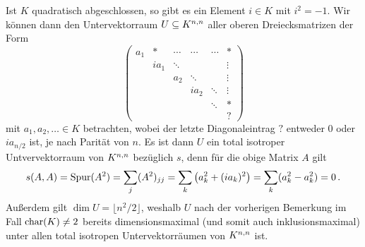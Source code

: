 Ist $K$ quadratisch abgeschlossen, so gibt es ein Element $i \in K$ mit $i^2 = -1$.
Wir können dann den Untervektorraum $U \subseteq \matrices{n}{K}$ aller oberen Dreiecksmatrizen der Form
\[
  \begin{pmatrix}
    a_1 & *     & \cdots  & \cdots  & \cdots  & *       \\
        & i a_1 & \ddots  &         &         & \vdots  \\
        &       & a_2     & \ddots  &         & \vdots  \\
        &       &         & i a_2   & \ddots  & \vdots  \\
        &       &         &         & \ddots  & *       \\
        &       &         &         &         & ?
  \end{pmatrix}
\]
mit $a_1, a_2, \dotsc \in K$ betrachten, wobei der letzte Diagonaleintrag $?$ entweder $0$ oder $i a_{n/2}$ ist, je nach Parität von $n$.
Es ist dann $U$ ein total isotroper Untvervektorraum von $\matrices{n}{K}$ bezüglich $s$, denn für die obige Matrix $A$ gilt
\[
    s(A,A)
  = \tr(A^2)
  = \sum_j (A^2)_{jj}
  = \sum_k \left( a_k^2 + (i a_k)^2 \right)
  = \sum_k ( a_k^2 - a_k^2 )
  = 0 \,.
\]
Außerdem gilt $\dim U = \lfloor n^2/2 \rfloor$, weshalb $U$ nach der vorherigen Bemerkung im Fall $\ringchar(K) \neq 2$ bereits dimensionsmaximal (und somit auch inklusionsmaximal) unter allen total isotropen Untervektorräumen von $\matrices{n}{K}$ ist.



